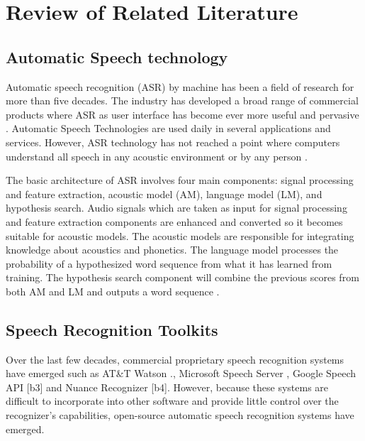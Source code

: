 
\chapter{Review of Related Literature}


\section{Automatic Speech technology}

Automatic speech recognition (ASR) by machine has been a field of research for more than five decades. The industry has developed a broad range of commercial products where ASR as user interface has become ever more useful and pervasive \cite{li2014overview}. Automatic Speech Technologies are used daily in several applications and services. However, ASR technology has not reached a point where computers understand all speech in any acoustic environment or by any person \cite{rabiner1993fundamentals}. 

The basic architecture of ASR involves four main components: signal processing and feature extraction, acoustic model (AM), language model (LM), and hypothesis search. Audio signals which are taken as input for signal processing and feature extraction components are enhanced and converted so it becomes suitable for acoustic models. The acoustic models are responsible for integrating knowledge about acoustics and phonetics. The language model processes the probability of a hypothesized word sequence from what it has learned from training. The hypothesis search component will combine the previous scores from both AM and LM and outputs a word sequence \cite{yu2016automatic}. 

\section{Speech Recognition Toolkits}
Over the last few decades, commercial proprietary speech recognition systems have emerged such as AT\&T Watson .\cite{goffin2005t}, Microsoft Speech Server \cite{dunn2007pro}, Google Speech API [b3] and Nuance Recognizer [b4]. However, because these systems are difficult to incorporate into other software and provide little control over the recognizer's capabilities, open-source automatic speech recognition systems have emerged.

